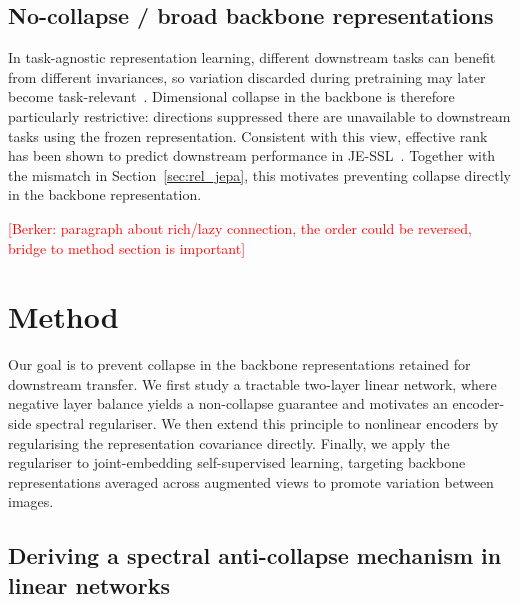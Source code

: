 \documentclass{article} %
\theoremstyle{remark}
\newcommand{\BD}[1]{\textcolor{red}{[Berker: #1]}}
\begin{document}
\subsection{No-collapse / broad backbone representations}

In task-agnostic representation learning, different downstream tasks can benefit from different invariances, so variation discarded during pretraining may later become task-relevant~\citep{wellericsson2021, tian2020makes}. Dimensional collapse in the backbone is therefore particularly restrictive: directions suppressed there are unavailable to downstream tasks using the frozen representation. Consistent with this view, effective rank has been shown to predict downstream performance in JE-SSL~\citep{rankme2023}. Together with the mismatch in Section~\ref{sec:rel_jepa}, this motivates preventing collapse directly in the backbone representation.


\BD{paragraph about rich/lazy connection, the order could be reversed, bridge to method section is important}

\newpage

\section{Method}

Our goal is to prevent collapse in the backbone representations retained for downstream transfer. We first study a tractable two-layer linear network, where negative layer balance yields a non-collapse guarantee
and motivates an encoder-side spectral regulariser. We then extend this principle to nonlinear encoders by regularising the representation covariance directly. Finally, we apply the regulariser to joint-embedding self-supervised learning, targeting backbone representations averaged across augmented views to promote variation between images.



\subsection{Deriving a spectral anti-collapse mechanism in linear networks}
\end{document}
